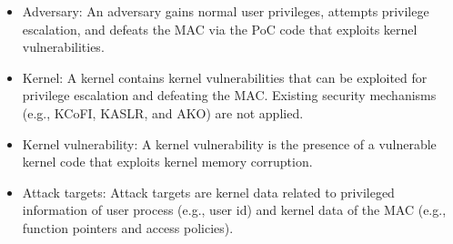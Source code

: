 \begin{itemize}%
  \item Adversary: An adversary gains normal user privileges, attempts
  privilege escalation, and defeats the MAC via the PoC code that exploits kernel
  vulnerabilities.

\item Kernel: A kernel contains kernel vulnerabilities that can be exploited for
privilege escalation and defeating the MAC. Existing security
mechanisms (e.g., KCoFI, KASLR, and AKO) are not applied.


  \item Kernel vulnerability: A kernel vulnerability is the presence of a vulnerable
  kernel code that exploits kernel memory corruption.

  \item Attack targets: Attack targets are kernel data related to
  privileged information of user process (e.g., user id) and kernel data of the MAC (e.g., function
  pointers and access policies).

\end{itemize}


